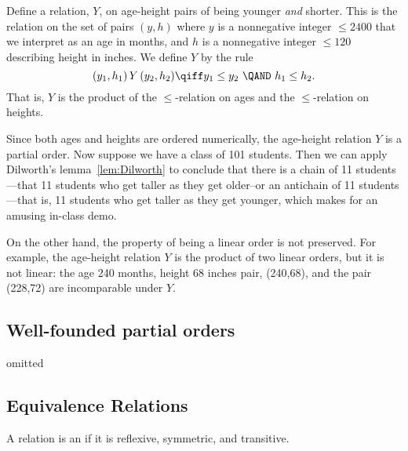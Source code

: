 \begin{example}\label{Y}
Define a relation, $Y$, on age-height pairs of being younger \emph{and}
shorter.  This is the relation on the set of pairs $(y,h)$ where $y$ is a
nonnegative integer $\le 2400$ that we interpret as an age in months, and $h$
is a nonnegative integer $\le 120$ describing height in inches.  We define $Y$
by the rule
\[
(y_1,h_1)\, Y\, (y_2,h_2) \qiff y_1 \le y_2\ \QAND\ h_1 \le h_2.
\]
That is, $Y$ is the product of the $\le$-relation on ages and the
$\le$-relation on heights.

Since both ages and heights are ordered numerically, the age-height
relation $Y$ is a partial order.  Now suppose we have a class of 101
students.  Then we can apply Dilworth's lemma~\ref{lem:Dilworth} to
conclude that there is a chain of 11 students---that 11 students who
get taller as they get older--or an antichain of 11 students---that
is, 11 students who get taller as they get younger, which makes for an
amusing in-class demo.
\end{example}

On the other hand, the property of being a linear order is not preserved.
For example, the age-height relation $Y$ is the product of two linear
orders, but it is not linear: the age 240 months, height 68 inches pair,
(240,68), and the pair (228,72) are incomparable under $Y$.

\begin{problems}

\classproblems
{}

\homeworkproblems
{}

\end{problems}

\begin{editingnotes}
\chapter*{Well-founded partial orders}
omitted
\end{editingnotes}

\section{Equivalence Relations}\label{equiv_rel_sec}
\begin{definition}
A relation is an  if it is reflexive,
symmetric, and transitive.
\end{definition}

